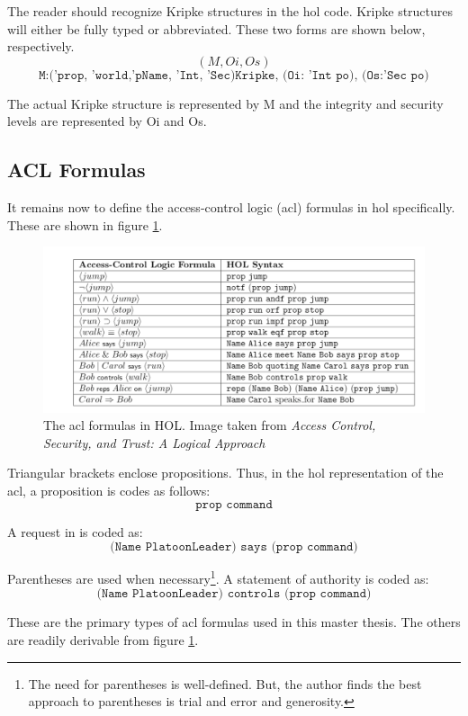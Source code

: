 \documentclass[../../main/main.tex]{subfiles}
\begin{document}
The reader should recognize Kripke structures in the \gls{hol} code.  Kripke structures will either be fully typed or abbreviated.  These two forms are shown below, respectively.  
\[ (M, Oi, Os) \]
\[ \texttt{M:('prop, 'world,'pName, 'Int, 'Sec)Kripke, (Oi: 'Int po), (Os:'Sec po)} \]

The actual Kripke structure is represented by M and the integrity and security levels are represented by Oi and Os.  

\subsection{ACL Formulas}
It remains now to define the access-control logic (\gls{acl}) formulas in \gls{hol} specifically.  These are shown in figure \ref{aclformulasHOL}.

\begin{figure}[h]
\centering
\includegraphics[width=\textwidth]{../figures/aclformulasHOL}
\caption{\label{aclformulasHOL}The \gls{acl} formulas in HOL.  Image taken from \textit{Access Control, Security, and Trust: A Logical Approach}\cite{ChinOlder}}
\end{figure}


Triangular brackets enclose propositions.  Thus, in the \gls{hol} representation of the \gls{acl}, a proposition is codes as follows:
\[\texttt{prop command} \]

A request in  is coded as: 
\[ \texttt{(Name PlatoonLeader) says (prop command)} \]

Parentheses are used when necessary\footnote{The need for parentheses is well-defined.  But, the author finds the best approach to parentheses is trial and error and generosity.}.  A statement of authority is coded as:
\[ \texttt{(Name PlatoonLeader) controls (prop command)} \]

These are the primary types of \gls{acl} formulas used in this master thesis.  The others are readily derivable from figure \ref{aclformulasHOL}.
\end{document}
